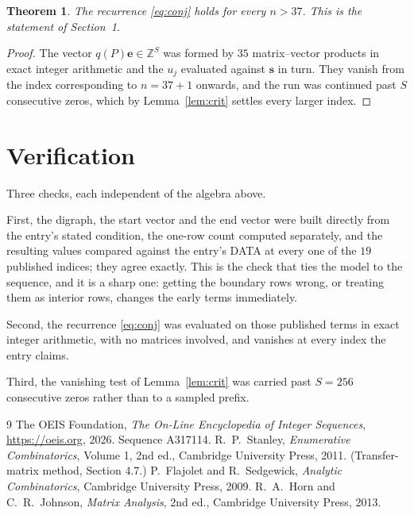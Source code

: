 \documentclass[11pt,a4paper]{article}
\theoremstyle{plain}
\newtheorem{theorem}{Theorem}
\theoremstyle{definition}
\begin{document}
\begin{theorem}
The recurrence \eqref{eq:conj} holds for every $n>37$. This is the statement of
Section~1.
\end{theorem}

\begin{proof}
The vector $q(P)\mathbf{e}\in\mathbb{Z}^{S}$ was formed by $35$ matrix--vector
products in exact integer arithmetic and the $u_j$ evaluated against $\mathbf{s}$ in turn.
They vanish from the index corresponding to $n=37+1$ onwards, and the run was continued
past $S$ consecutive zeros, which by Lemma~\ref{lem:crit} settles every larger index.
\end{proof}

\section{Verification}

Three checks, each independent of the algebra above.

First, the digraph, the start vector and the end vector were built directly from the
entry's stated condition, the one-row count computed separately, and the resulting values
compared against the entry's DATA at every one of the $19$ published indices; they
agree exactly. This is the check that ties the model to the sequence, and it is a sharp one:
getting the boundary rows wrong, or treating them as interior rows, changes the early terms
immediately.

Second, the recurrence \eqref{eq:conj} was evaluated on those published terms in exact
integer arithmetic, with no matrices involved, and vanishes at every index the entry claims.

Third, the vanishing test of Lemma~\ref{lem:crit} was carried past $S=256$ consecutive
zeros rather than to a sampled prefix.

\begin{thebibliography}{9}
 The OEIS Foundation, \emph{The On-Line Encyclopedia of Integer
Sequences}, \url{https://oeis.org}, 2026. Sequence A317114.
 R.~P.~Stanley, \emph{Enumerative Combinatorics}, Volume 1, 2nd ed.,
Cambridge University Press, 2011. (Transfer-matrix method, Section 4.7.)
 P.~Flajolet and R.~Sedgewick, \emph{Analytic Combinatorics}, Cambridge
University Press, 2009.
 R.~A.~Horn and C.~R.~Johnson, \emph{Matrix Analysis}, 2nd ed., Cambridge
University Press, 2013.
\end{thebibliography}
\end{document}
